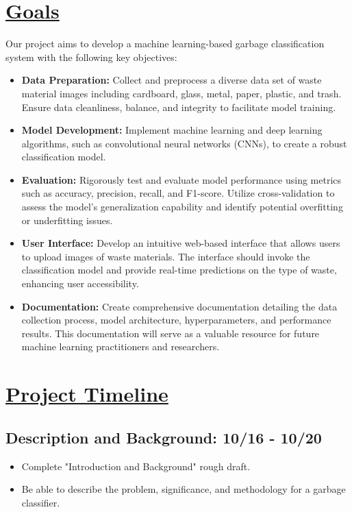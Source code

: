 \documentclass[conference]{IEEEtran}
\begin{document}
\section{\underline{Goals}}
Our project aims to develop a machine learning-based garbage classification system with the following key objectives:
\begin{itemize}
    \item \textbf{Data Preparation:} Collect and  preprocess a diverse data set of waste material images including cardboard, glass, metal, paper, plastic, and trash. Ensure data cleanliness, balance, and integrity to facilitate model training.
    \item \textbf{Model Development:} Implement machine learning and deep learning algorithms, such as convolutional neural networks (CNNs), to create a robust classification model.
    \item \textbf{Evaluation:} Rigorously test and evaluate model performance using metrics such as accuracy, precision, recall, and F1-score. Utilize cross-validation to assess the model's generalization capability and identify potential overfitting or underfitting issues.
    \item \textbf{User Interface:} Develop an intuitive web-based interface that allows users to upload images of waste materials. The interface should invoke the classification model and provide real-time predictions on the type of waste, enhancing user accessibility.
    \item \textbf{Documentation:} Create comprehensive documentation detailing the data collection process, model architecture, hyperparameters, and performance results. This documentation will serve as a valuable resource for future machine learning practitioners and researchers.
\end{itemize}
\section{\underline{Project Timeline}}
\subsection{\textbf{Description and Background: 10/16 - 10/20}}
\begin{itemize}
    \item Complete "Introduction and Background" rough draft.
    \item Be able to describe the problem, significance, and methodology for a garbage classifier.
\end{itemize}
\end{document}
